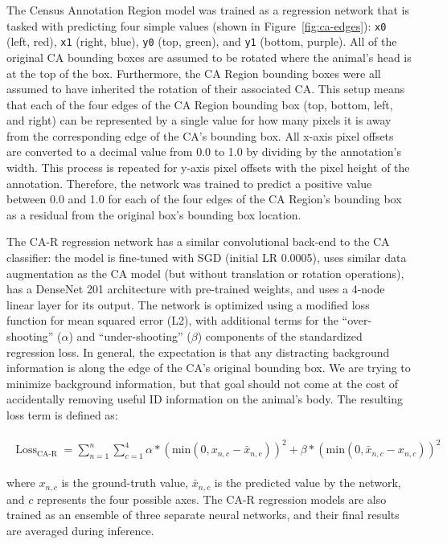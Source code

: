 The Census Annotation Region model was trained as a regression network that is tasked with predicting four simple values (shown in Figure~\ref{fig:ca-edges}): \texttt{x0} (left, red), \texttt{x1} (right, blue), \texttt{y0} (top, green), and \texttt{y1} (bottom, purple).  All of the original CA bounding boxes are assumed to be rotated where the animal's head is at the top of the box.  Furthermore, the CA Region bounding boxes were all assumed to have inherited the rotation of their associated CA.  This setup means that each of the four edges of the CA Region bounding box (top, bottom, left, and right) can be represented by a single value for how many pixels it is away from the corresponding edge of the CA's bounding box.  All x-axis pixel offsets are converted to a decimal value from 0.0 to 1.0 by dividing by the annotation's width.  This process is repeated for y-axis pixel offsets with the pixel height of the annotation.  Therefore, the network was trained to predict a positive value between 0.0 and 1.0 for each of the four edges of the CA Region's bounding box as a residual from the original box's bounding box location.

The CA-R regression network has a similar convolutional back-end to the CA classifier: the model is fine-tuned with SGD (initial LR 0.0005), uses similar data augmentation as the CA model (but without translation or rotation operations), has a DenseNet 201 architecture with pre-trained weights, and uses a 4-node linear layer for its output.  The network is optimized using a modified loss function for mean squared error (L2), with additional terms for the ``over-shooting'' ($\alpha$) and ``under-shooting'' ($\beta$) components of the standardized regression loss.  In general, the expectation is that any distracting background information is along the edge of the CA's original bounding box.  We are trying to minimize background information, but that goal should not come at the cost of accidentally removing useful ID information on the animal's body.  The resulting loss term is defined as:

\begin{align}
    \begin{split}
        \text{Loss}_{\text{CA-R}} &= \sum_{n=1}^{n} \sum_{c=1}^{4} \alpha * (\text{min}(0, x_{n,c} - \bar{x}_{n,c}))^2 + \beta * (\text{min}(0, \bar{x}_{n,c} - x_{n,c}))^2
    \end{split}
\end{align}

\noindent where $x_{n,c}$ is the ground-truth value, $\bar{x}_{n,c}$ is the predicted value by the network, and $c$ represents the four possible axes.  The CA-R regression models are also trained as an ensemble of three separate neural networks, and their final results are averaged during inference.

